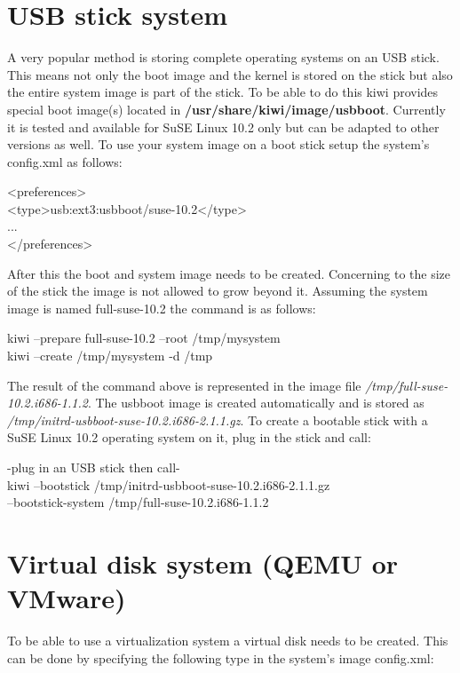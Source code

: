 \section{USB stick system}
A very popular method is storing complete operating systems on an USB
stick. This means not only the boot image and the kernel is stored on
the stick but also the entire system image is part of the stick.
To be able to do this kiwi provides special boot image(s) located in
\textbf{/usr/share/kiwi/image/usbboot}. Currently it is tested and available
for SuSE Linux 10.2 only but can be adapted to other versions as well.
To use your system image on a boot stick setup the system's config.xml
as follows:

\begin{Command}{14cm}
<preferences>\\
\hspace*{1cm}<type>usb:ext3:usbboot/suse-10.2</type>\\
\hspace*{1cm}...\\
</preferences>
\end{Command}

After this the boot and system image needs to be
created. Concerning to the size of the stick the image is not allowed to
grow beyond it. Assuming the system image is named full-suse-10.2
the command is as follows:

\begin{Command}{14cm}
	kiwi --prepare full-suse-10.2 --root /tmp/mysystem\\
	kiwi --create /tmp/mysystem -d /tmp
\end{Command}

The result of the command above is represented in the image file
\textit{/tmp/full-suse-10.2.i686-1.1.2}. The usbboot image is created
automatically and is stored as
\textit{/tmp/initrd-usbboot-suse-10.2.i686-2.1.1.gz}.
To create a bootable stick with a SuSE Linux 10.2 operating system on
it, plug in the stick and call:

\begin{Command}{14cm}
	-plug in an USB stick then call-\\
	kiwi --bootstick /tmp/initrd-usbboot-suse-10.2.i686-2.1.1.gz \bs\\
    \hspace*{1.1cm}--bootstick-system /tmp/full-suse-10.2.i686-1.1.2
\end{Command}

\section{Virtual disk system (QEMU or VMware)}
To be able to use a virtualization system a virtual disk needs to
be created. This can be done by specifying the following type in the
system's image config.xml:


